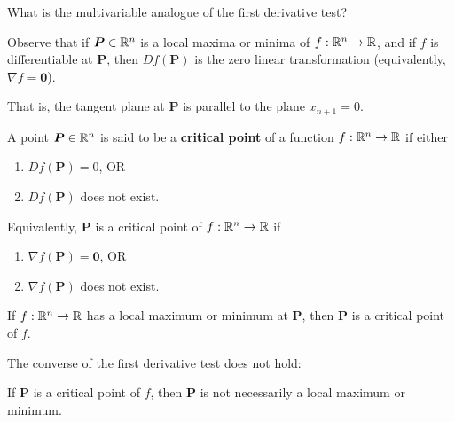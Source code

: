 \begin{motivating}
    What is the multivariable analogue of the first derivative test?
\end{motivating}

\begin{remark}
        Observe that if $\bm{P} \in \mathbb{R}^n$ is a local maxima or minima of $f: \mathbb{R}^n \to \mathbb{R}$, and if $f$ is differentiable at $\bm{P}$, then $Df(\bm{P})$ is the zero linear transformation (equivalently, $\nabla f = \bm{0}$).

        That is, the tangent plane at $\bm{P}$ is parallel to the plane $x_{n+1} = 0$.
    \end{remark}

\begin{definition}
        A point $\bm{P} \in \mathbb{R}^n$ is said to be a \textbf{critical point} of a function $f: \mathbb{R}^n \to \mathbb{R}$ if either

        \begin{enumerate}
            \item $Df(\bm{P}) = 0$, OR
            \item $Df(\bm{P})$ does not exist.
        \end{enumerate}
      
    \end{definition}

\begin{proposition}
     Equivalently, $\bm{P}$ is a critical point of $f: \mathbb{R}^n \to \mathbb{R}$ if
    \begin{enumerate}
            \item $\nabla f(\bm{P}) = \bm{0}$, OR
            \item $\nabla f(\bm{P})$ does not exist.
        \end{enumerate}
\end{proposition}


\begin{theorem}
        If $f: \mathbb{R}^n \to \mathbb{R}$ has a local maximum or minimum at $\bm{P}$, then $\bm{P}$ is a critical point of $f$.
    \end{theorem}


    \begin{remark}
        The converse of the first derivative test does not hold:
        
        If $\bm{P}$ is a critical point of $f$, then $\bm{P}$ is not necessarily a local maximum or minimum.
    \end{remark}

